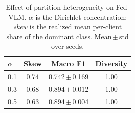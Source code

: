 \begin{table}[t]
\caption{Effect of partition heterogeneity on Fed-VLM. $\alpha$ is the
Dirichlet concentration; \emph{skew} is the realized mean per-client share of
the dominant class. Mean\,$\pm$\,std over seeds.}
\label{tab:alpha}
\centering\footnotesize
\setlength\tabcolsep{5pt}
\begin{tabular}{lccc}
\toprule
$\alpha$ & Skew & Macro F1 & Diversity\\
\midrule
0.1 & 0.74 & 0.742\,$\pm$\,0.169 & 1.00 \\
0.3 & 0.68 & 0.894\,$\pm$\,0.012 & 1.00 \\
0.5 & 0.63 & 0.894\,$\pm$\,0.004 & 1.00 \\
\bottomrule
\end{tabular}
\end{table}
